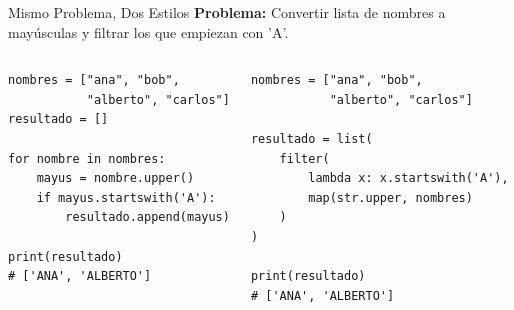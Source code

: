 \documentclass[aspectratio=169]{beamer}
\begin{document}
\begin{frame}[fragile]{Mismo Problema, Dos Estilos}
    \textbf{Problema:} Convertir lista de nombres a mayúsculas y filtrar los que empiezan con 'A'.
    
    \begin{columns}
        \begin{lstlisting}[title=Imperativo]
nombres = ["ana", "bob", 
           "alberto", "carlos"]
resultado = []

for nombre in nombres:
    mayus = nombre.upper()
    if mayus.startswith('A'):
        resultado.append(mayus)

print(resultado)
# ['ANA', 'ALBERTO']
        \end{lstlisting}
        
        \begin{lstlisting}[title=Funcional]
nombres = ["ana", "bob", 
           "alberto", "carlos"]

resultado = list(
    filter(
        lambda x: x.startswith('A'),
        map(str.upper, nombres)
    )
)

print(resultado)
# ['ANA', 'ALBERTO']
        \end{lstlisting}
    \end{columns}
\end{frame}
\end{document}
